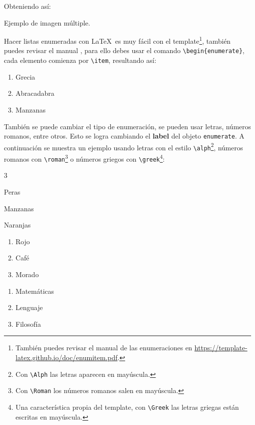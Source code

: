 	Obteniendo así:

	\begin{images}{Ejemplo de imagen múltiple.}
		\imagesnewline
	\end{images}

\clearpage
{}


	Hacer listas enumeradas con \LaTeX\ es muy fácil con el template\footnote{También puedes revisar el manual de las enumeraciones en \url{https://template-latex.github.io/doc/enumitem.pdf}.}, también puedes revisar el manual \cite{template}, para ello debes usar el comando \texttt{\textbackslash begin\{enumerate\}}, cada elemento comienza por \texttt{\textbackslash item}, resultando así:

	\begin{enumerate}
		\item Grecia
		\item Abracadabra
		\item Manzanas
	\end{enumerate}

	También se puede cambiar el tipo de enumeración, se pueden usar letras, números romanos, entre otros. Esto se logra cambiando el \textbf{label} del objeto \texttt{enumerate}. A continuación se muestra un ejemplo usando letras con el estilo \texttt{\textbackslash alph}\footnote{Con \texttt{\textbackslash Alph} las letras aparecen en mayúscula.}, números romanos con \texttt{\textbackslash roman}\footnote{Con \texttt{\textbackslash Roman} los números romanos salen en mayúscula.} o números griegos con \texttt{\textbackslash greek}\footnote{Una característica propia del template, con \texttt{\textbackslash Greek} las letras griegas están escritas en mayúscula.}:

	\begin{multicols}{3}
		\begin{enumeratebf}[label=\alph*) ] %
			\item Peras
			\item Manzanas
			\item Naranjas
		\end{enumeratebf}

		\begin{enumerate}[label=\roman*) ]
			\item Rojo
			\item Café
			\item Morado
		\end{enumerate}
		
		\begin{enumerate}[label=\greek*) ]
			\item Matemáticas
			\item Lenguaje
			\item Filosofía
		\end{enumerate}
	\end{multicols}

